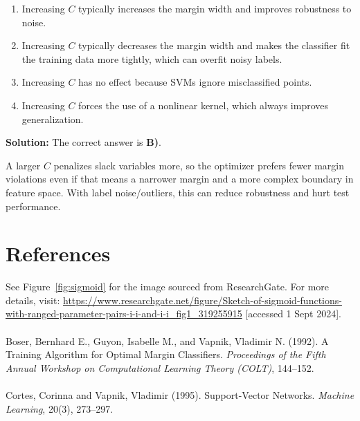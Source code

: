 \documentclass{article}
\begin{document}
\begin{enumerate}
\begin{enumerate}
    \item Increasing $C$ typically increases the margin width and improves robustness to noise.
    \item Increasing $C$ typically decreases the margin width and makes the classifier fit the training data more tightly, which can overfit noisy labels.
    \item Increasing $C$ has no effect because SVMs ignore misclassified points.
    \item Increasing $C$ forces the use of a nonlinear kernel, which always improves generalization.
\end{enumerate}

\textbf{Solution:} The correct answer is \textbf{B)}.

A larger $C$ penalizes slack variables more, so the optimizer prefers fewer margin violations even if that means a narrower margin and a more complex boundary in feature space. With label noise/outliers, this can reduce robustness and hurt test performance.



\end{enumerate}

\section*{References}
See Figure~\ref{fig:sigmoid} for the image sourced from ResearchGate. For more details, visit:
\url{https://www.researchgate.net/figure/Sketch-of-sigmoid-functions-with-ranged-parameter-pairs-i-i-and-i-i_fig1_319255915} [accessed 1 Sept 2024].\\ \\
Boser, Bernhard E., Guyon, Isabelle M., and Vapnik, Vladimir N. (1992). A Training Algorithm for Optimal Margin Classifiers. \textit{Proceedings of the Fifth Annual Workshop on Computational Learning Theory (COLT)}, 144--152.\\ \\
Cortes, Corinna and Vapnik, Vladimir (1995). Support-Vector Networks. \textit{Machine Learning}, 20(3), 273--297.
\end{document}
